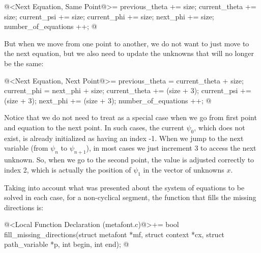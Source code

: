 \iniciocodigo
@<Next Equation, Same Point@>=
{
  previous_theta += size;
  current_theta += size;
  current_psi += size;
  current_phi += size;
  next_phi += size;
  number_of_equations ++;
}
@
\fimcodigo

But when we move from one point to another, we do not want to just
move to the next equation, but we also need to update the unknowns
that will no longer be the same:

\iniciocodigo
@<Next Equation, Next Point@>=
{
  previous_theta = current_theta + size;
  current_phi = next_phi + size;
  current_theta += (size + 3);
  current_psi += (size + 3);
  next_phi += (size + 3);
  number_of_equations ++;
}
@
\fimcodigo

Notice that we do not need to treat as a special case when we go from
first point and equation to the next point. In such cases, the current
$\psi_0$, which does not exist, is already initialized as having an
index -1. When we jump to the next variable (from $\psi_{n}$ to
$\psi_{n+1}$), in most cases we just increment 3 to access the next
unknown. So, when we go to the second point, the value is adjusted
correctly to index 2, which is actually the position of $\psi_1$ in
the vector of unknowns $x$.

Taking into account what was presented about the system of equations
to be solved in each case, for a non-cyclical segment, the function
that fills the missing directions is:

\iniciocodigo
@<Local Function Declaration (metafont.c)@>+=
bool fill_missing_directions(struct metafont *mf, struct context *cx,
                             struct path_variable *p, int begin, int end);
@
\fimcodigo

